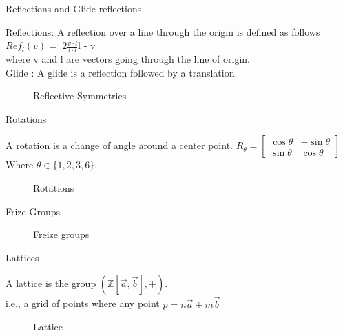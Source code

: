 \documentclass{beamer}
\theoremstyle{definition}
\begin{document}
\begin{frame}{Reflections and Glide reflections}
    \begin{definition}
        Reflections: A reflection over a line through the origin is defined as follows\\
        $Ref_l(v) =$ \(2\frac{v \cdot l}{l \cdot l}\)l - v\\ where v and l are vectors going through the line of origin.\\ 
        Glide : A glide is a reflection followed by a translation.  \cite{Angela:2023}
    \end{definition}
    \begin{figure}
        \centering
        
        \caption{Reflective Symmetries}
        \label{fig:symmetries}
    \end{figure}
\end{frame}

\begin{frame}{Rotations}
    \begin{definition}
        A rotation is a change of angle around a center point.
        $R_\theta = \begin{bmatrix}
            \cos\theta & -\sin\theta\\
            \sin\theta & \cos\theta
        \end{bmatrix}$ 
        Where $\theta \in \{1,2,3,6\}.$ \cite{Angela:2023}
    \end{definition}
    \begin{figure}
        \centering
        
        \caption{Rotations}
        \label{fig:enter-label}
    \end{figure}
\end{frame}

\begin{frame}{Frize Groups}
    \begin{figure}
        \centering
        
        \caption{Freize groups}
        \label{fig:Freize}
    \end{figure}
\end{frame}

\begin{frame}{Lattices}
    \begin{definition}
        A lattice is the group $(\mathbb{Z}[\Vec{a},\Vec{b}],+).$\\
        i.e., a grid of points where any point $p = n\Vec{a} +m\Vec{b}$ 
    \end{definition}
    \begin{figure}
        \centering
        \caption{Lattice}
        \label{fig:enter-label}
    \end{figure}
\end{frame}
\end{document}

